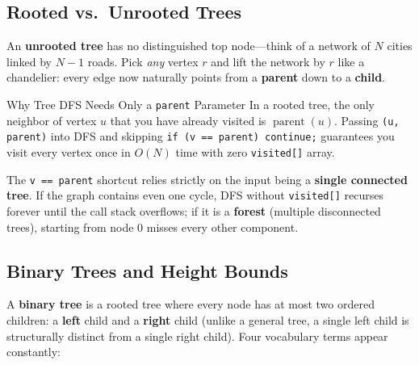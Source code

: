 \documentclass[11pt,a4paper]{article}
\theoremstyle{definition}
\begin{document}
\subsection{Rooted vs.\ Unrooted Trees}

An \textbf{unrooted tree} has no distinguished top node---think of a network of $N$ cities linked by $N - 1$ roads. Pick \emph{any} vertex $r$ and lift the network by $r$ like a chandelier: every edge now naturally points from a \textbf{parent} down to a \textbf{child}.

\begin{calloutbox}{Why Tree DFS Needs Only a \texttt{parent} Parameter}
In a rooted tree, the only neighbor of vertex $u$ that you have already visited is $\operatorname{parent}(u)$. Passing \texttt{(u, parent)} into DFS and skipping \texttt{if (v == parent) continue;} guarantees you visit every vertex once in $O(N)$ time with zero \texttt{visited[]} array.
\end{calloutbox}

\begin{watchoutbox}
The \texttt{v == parent} shortcut relies strictly on the input being a \textbf{single connected tree}. If the graph contains even one cycle, DFS without \texttt{visited[]} recurses forever until the call stack overflows; if it is a \textbf{forest} (multiple disconnected trees), starting from node $0$ misses every other component.
\end{watchoutbox}

\subsection{Binary Trees and Height Bounds}

A \textbf{binary tree} is a rooted tree where every node has at most two ordered children: a \textbf{left} child and a \textbf{right} child (unlike a general tree, a single left child is structurally distinct from a single right child). Four vocabulary terms appear constantly:
\end{document}
